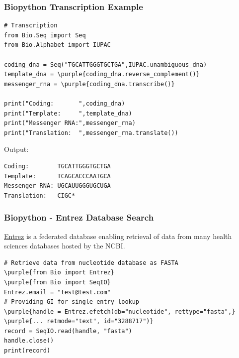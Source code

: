 \documentclass[xcolor=svgnames, handout]{beamer}
\newcommand{\purple}[1]{{\textcolor{purple}{#1}}}
\newcommand{\ft}[1]{\frametitle{#1}}
\begin{document}
\begin{frame}[fragile]\ft{Biopython Transcription Example}
\begin{Verbatim}[commandchars=\\\{\}, fontsize=\small, frame=single]
# Transcription
from Bio.Seq import Seq
from Bio.Alphabet import IUPAC

coding_dna = Seq("TGCATTGGGTGCTGA",IUPAC.unambiguous_dna)
template_dna = \purple{coding_dna.reverse_complement()}
messenger_rna = \purple{coding_dna.transcribe()}

print("Coding:       ",coding_dna)
print("Template:     ",template_dna)
print("Messenger RNA:",messenger_rna)
print("Translation:  ",messenger_rna.translate())
\end{Verbatim}
Output:
\begin{Verbatim}[frame=single]
Coding:        TGCATTGGGTGCTGA
Template:      TCAGCACCCAATGCA
Messenger RNA: UGCAUUGGGUGCUGA
Translation:   CIGC*
\end{Verbatim}

\end{frame}


\begin{frame}[fragile]\ft{Biopython - Entrez Database Search}
\href{https://www.ncbi.nlm.nih.gov/Web/Search/entrezfs.html}{Entrez} is a federated database enabling retrieval of data from many  health sciences databases hosted by the NCBI.

\begin{Verbatim}[xleftmargin=.1in, fontsize=\small, commandchars=\\\{\}] 
# Retrieve data from nucleotide database as FASTA
\purple{from Bio import Entrez}
\purple{from Bio import SeqIO}
Entrez.email = "test@test.com"
# Providing GI for single entry lookup
\purple{handle = Entrez.efetch(db="nucleotide", rettype="fasta",} 
\purple{... retmode="text", id="3288717")}
record = SeqIO.read(handle, "fasta")
handle.close()
print(record)
\end{Verbatim}

\end{frame}
\end{document}
